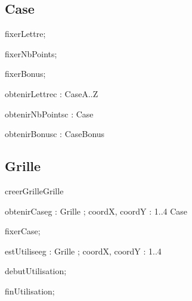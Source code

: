 \subsection{Case}
\begin{algorithme}
  \signatureprocedure
  {fixerLettre}{; }

  \signatureprocedure
  {fixerNbPoints}{; }

  \signatureprocedure
  {fixerBonus}{; }

  \signaturefonction
  {obtenirLettre}{c : Case}{A..Z}

  \signaturefonction
  {obtenirNbPoints}{c : Case}{\naturelNonNul}

  \signaturefonction
  {obtenirBonus}{c : Case}{Bonus}

\end{algorithme}

\subsection{Grille}
\begin{algorithme}
  \signaturefonction
  {creerGrille}{}{Grille}

  \signaturefonction
  {obtenirCase}{g : Grille ; coordX, coordY : 1..4 }{Case}

  \signatureprocedure
  {fixerCase}{; }

  \signaturefonction
  {estUtilisee}{g : Grille ; coordX, coordY : 1..4}{\booleen}

  \signatureprocedure
  {debutUtilisation}{; }

  \signatureprocedure
  {finUtilisation}{; }

\end{algorithme}
